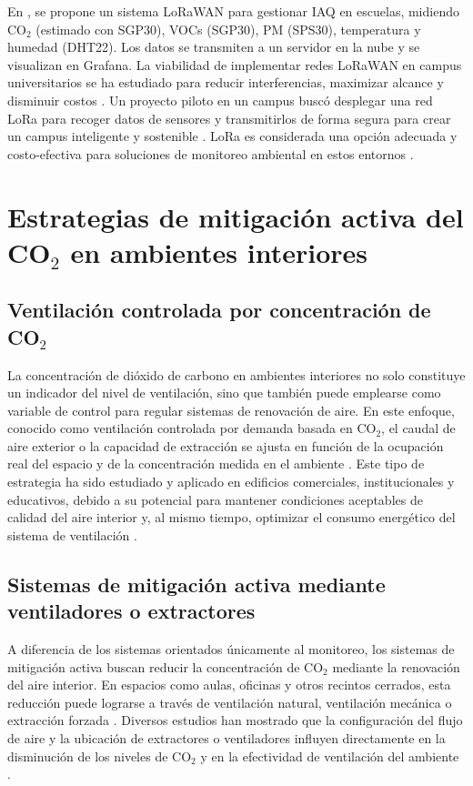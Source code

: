 En \cite{Low_Cost_LoRa_Based_IoT_Edge_Device_for_Indoor_Air_Quality_Management_in_Schools}, se propone un sistema LoRaWAN para gestionar IAQ en escuelas, midiendo CO\(_2\) (estimado con SGP30), VOCs (SGP30), PM (SPS30), temperatura y humedad (DHT22). Los datos se transmiten a un servidor en la nube y se visualizan en Grafana.
La viabilidad de implementar redes LoRaWAN en campus universitarios se ha estudiado para reducir interferencias, maximizar alcance y disminuir costos \cite{universidad_sevilla_nodate, masache_cabrera_2022}. Un proyecto piloto en un campus buscó desplegar una red LoRa para recoger datos de sensores y transmitirlos de forma segura para crear un campus inteligente y sostenible \cite{alai_secure_nodate}. LoRa es considerada una opción adecuada y costo-efectiva para soluciones de monitoreo ambiental en estos entornos \cite{mokolo_2022}.


\section{Estrategias de mitigación activa del CO$_2$ en ambientes interiores}

\subsection{Ventilación controlada por concentración de CO$_2$}

La concentración de dióxido de carbono en ambientes interiores no solo constituye un indicador del nivel de ventilación, sino que también puede emplearse como variable de control para regular sistemas de renovación de aire. En este enfoque, conocido como ventilación controlada por demanda basada en CO$_2$, el caudal de aire exterior o la capacidad de extracción se ajusta en función de la ocupación real del espacio y de la concentración medida en el ambiente \cite{emmerich_persily_2001,delwati_2018}. Este tipo de estrategia ha sido estudiado y aplicado en edificios comerciales, institucionales y educativos, debido a su potencial para mantener condiciones aceptables de calidad del aire interior y, al mismo tiempo, optimizar el consumo energético del sistema de ventilación \cite{emmerich_persily_2001,delwati_2018}.

\subsection{Sistemas de mitigación activa mediante ventiladores o extractores}

A diferencia de los sistemas orientados únicamente al monitoreo, los sistemas de mitigación activa buscan reducir la concentración de CO$_2$ mediante la renovación del aire interior. En espacios como aulas, oficinas y otros recintos cerrados, esta reducción puede lograrse a través de ventilación natural, ventilación mecánica o extracción forzada \cite{ovando_chacon_2022,bordin_2025}. Diversos estudios han mostrado que la configuración del flujo de aire y la ubicación de extractores o ventiladores influyen directamente en la disminución de los niveles de CO$_2$ y en la efectividad de ventilación del ambiente \cite{ovando_chacon_2022}.

